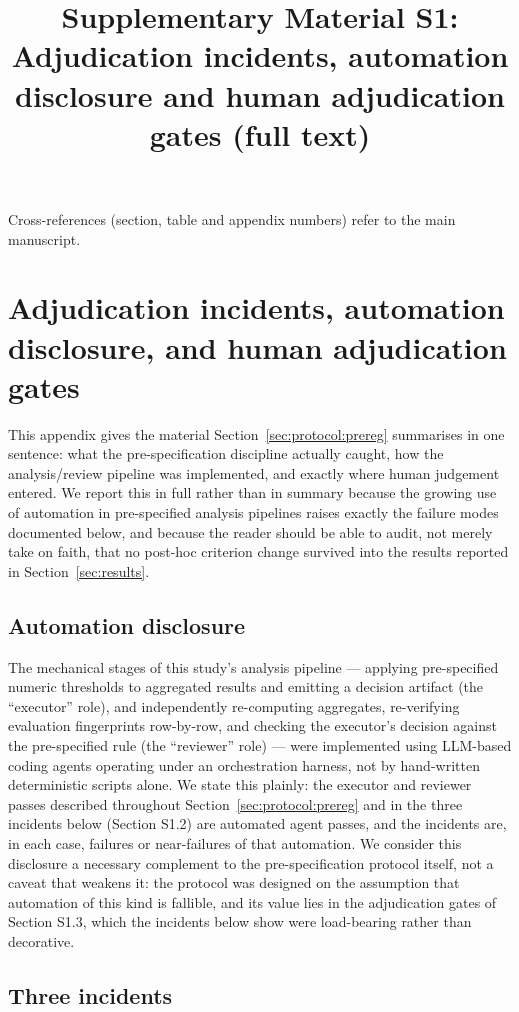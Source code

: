 \documentclass[11pt]{article}
\title{Supplementary Material S1: Adjudication incidents, automation disclosure and human adjudication gates (full text)}
\date{}
\begin{document}
\maketitle
\noindent Cross-references (section, table and appendix numbers) refer to the main manuscript.
\section*{Adjudication incidents, automation disclosure, and human adjudication gates}


This appendix gives the material Section~\ref{sec:protocol:prereg} summarises in one sentence: what the pre-specification discipline actually caught, how the analysis/review pipeline was implemented, and exactly where human judgement entered. We report this in full rather than in summary because the growing use of automation in pre-specified analysis pipelines raises exactly the failure modes documented below, and because the reader should be able to audit, not merely take on faith, that no post-hoc criterion change survived into the results reported in Section~\ref{sec:results}.

\subsection{Automation disclosure}

The mechanical stages of this study's analysis pipeline --- applying pre-specified numeric thresholds to aggregated results and emitting a decision artifact (the ``executor'' role), and independently re-computing aggregates, re-verifying evaluation fingerprints row-by-row, and checking the executor's decision against the pre-specified rule (the ``reviewer'' role) --- were implemented using LLM-based coding agents operating under an orchestration harness, not by hand-written deterministic scripts alone. We state this plainly: the executor and reviewer passes described throughout Section~\ref{sec:protocol:prereg} and in the three incidents below (Section S1.2) are automated agent passes, and the incidents are, in each case, failures or near-failures of that automation. We consider this disclosure a necessary complement to the pre-specification protocol itself, not a caveat that weakens it: the protocol was designed on the assumption that automation of this kind is fallible, and its value lies in the adjudication gates of Section S1.3, which the incidents below show were load-bearing rather than decorative.

\subsection{Three incidents}
\end{document}
